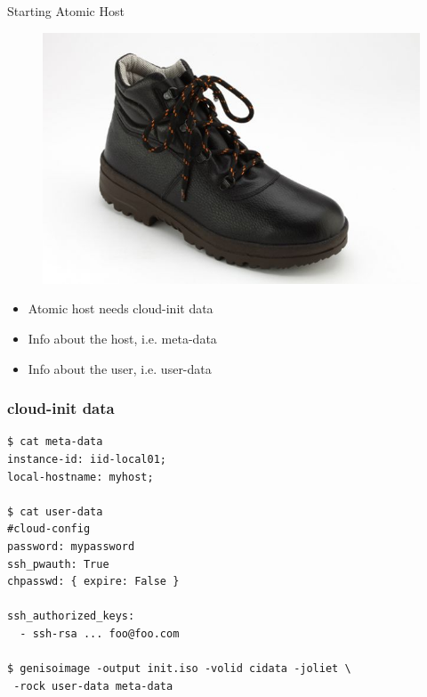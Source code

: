 \documentclass{beamer}
\begin{document}
\begin{frame}{Starting Atomic Host}
\begin{figure}[htp]
\centering
\includegraphics[scale=0.30]{boot.jpg}
\label{}
\end{figure}
\begin{itemize}
  \item Atomic host needs cloud-init data
  \item Info about the host, i.e. meta-data
  \item Info about the user, i.e. user-data
\end{itemize}
\end{frame}

\begin{frame}[fragile]
\frametitle{cloud-init data}
\begin{verbatim}
$ cat meta-data
instance-id: iid-local01;
local-hostname: myhost;

$ cat user-data
#cloud-config
password: mypassword
ssh_pwauth: True
chpasswd: { expire: False }

ssh_authorized_keys:
  - ssh-rsa ... foo@foo.com

$ genisoimage -output init.iso -volid cidata -joliet \
 -rock user-data meta-data
\end{verbatim}
\end{frame}
\end{document}
